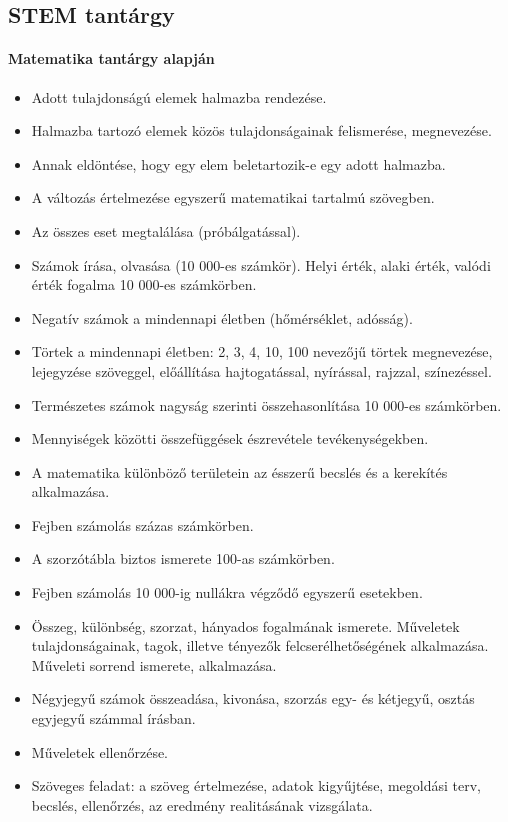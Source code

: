 \subsection{STEM tantárgy}
\paragraph{Matematika tantárgy alapján}
\begin{itemize}
\item Adott tulajdonságú elemek halmazba rendezése.
\item Halmazba tartozó elemek közös tulajdonságainak felismerése, megnevezése.
\item Annak eldöntése, hogy egy elem beletartozik-e egy adott halmazba.
\item A változás értelmezése egyszerű matematikai tartalmú szövegben.
\item Az összes eset megtalálása (próbálgatással).
\item Számok írása, olvasása (10 000-es számkör). Helyi érték, alaki érték, valódi érték fogalma 10 000-es számkörben.
\item Negatív számok a mindennapi életben (hőmérséklet, adósság).
\item Törtek a mindennapi életben: 2, 3, 4, 10, 100 nevezőjű törtek megnevezése, lejegyzése szöveggel, előállítása hajtogatással, nyírással, rajzzal, színezéssel.
\item Természetes számok nagyság szerinti összehasonlítása 10 000-es számkörben.
\item Mennyiségek közötti összefüggések észrevétele tevékenységekben.
\item A matematika különböző területein az ésszerű becslés és a kerekítés alkalmazása.
\item Fejben számolás százas számkörben.
\item A szorzótábla biztos ismerete 100-as számkörben.
\item Fejben számolás 10 000-ig nullákra végződő egyszerű esetekben.
\item Összeg, különbség, szorzat, hányados fogalmának ismerete. Műveletek tulajdonságainak, tagok, illetve tényezők felcserélhetőségének alkalmazása. Műveleti sorrend ismerete, alkalmazása.
\item Négyjegyű számok összeadása, kivonása, szorzás egy- és kétjegyű, osztás egyjegyű számmal írásban.
\item Műveletek ellenőrzése.
\item Szöveges feladat: a szöveg értelmezése, adatok kigyűjtése, megoldási terv, becslés, ellenőrzés, az eredmény realitásának vizsgálata.

\end{itemize}
